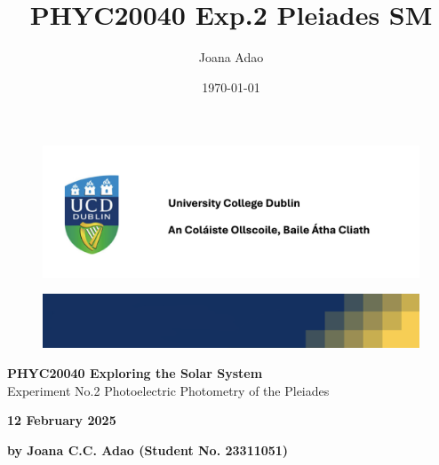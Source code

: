 \documentclass[12pt]{article}
\title{PHYC20040 Exp.2 Pleiades SM}
\author{Joana Adao}
\date{\today}
\begin{document}
\begin{titlepage}
    \begin{center}

        \begin{figure}[ht]
            \includegraphics[width=\textwidth]{UCDLogo.png}
        \end{figure}
        
        \begin{figure}
            \centerline{\includegraphics[width=\paperwidth]{UCDBanner.png}}
        \end{figure}

        \vspace{4cm}

        {\LARGE \bfseries PHYC20040 Exploring the Solar System}\\
        \vspace{0.75cm}
        {\Large Experiment No.2 Photoelectric Photometry of the Pleiades}
        
        \vspace{1cm}
    
    {\Large \textbf{12 February 2025}}

    \vspace{2cm}
    
    {\large \textbf{by Joana C.C. Adao (Student No. 23311051)}}\\

    \end{center}
    
   \clearpage

\end{titlepage}

\setcounter{page}{1}
\tableofcontents

\newpage
\end{document}
